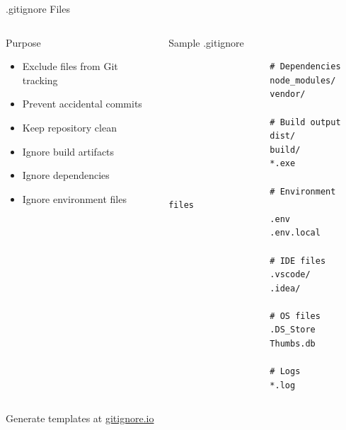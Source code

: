 \documentclass[aspectratio=169]{beamer}
\begin{document}
	\begin{frame}{.gitignore Files}
		\begin{columns}[T]
			\begin{block}{Purpose}
				\begin{itemize}
					\item Exclude files from Git tracking
					\item Prevent accidental commits
					\item Keep repository clean
					\item Ignore build artifacts
					\item Ignore dependencies
					\item Ignore environment files
				\end{itemize}
			\end{block}
			
			\begin{exampleblock}{Sample .gitignore}
				\begin{verbatim}
					# Dependencies
					node_modules/
					vendor/
					
					# Build output
					dist/
					build/
					*.exe
					
					# Environment files
					.env
					.env.local
					
					# IDE files
					.vscode/
					.idea/
					
					# OS files
					.DS_Store
					Thumbs.db
					
					# Logs
					*.log
				\end{verbatim}
			\end{exampleblock}
		\end{columns}
		
		\vspace{0.3cm}
		\begin{center}
			\small{Generate templates at \href{https://gitignore.io}{gitignore.io}}
		\end{center}
	\end{frame}
	
\end{document}
